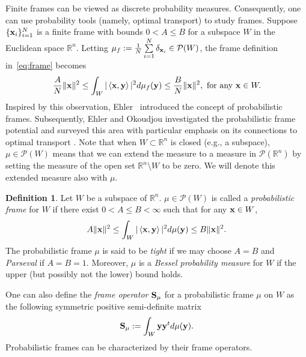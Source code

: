 \documentclass{amsart}
\numberwithin{equation}{section}
\newcommand\bR{{\mathbb R}}
\theoremstyle{plain}
\theoremstyle{remark}
\theoremstyle{definition}
\newtheorem{definition}[theorem]{Definition}
\begin{document}
Finite frames can be viewed as discrete probability measures. Consequently, one can use probability tools (namely, optimal transport) to study frames. Suppose $\{{\bf x}_i\}_{i=1}^N$ is a finite frame with bounds $0<A \leq B$ for a subspace $W$ in the Euclidean space $\mathbb{R}^n$. Letting $\mu_f := \frac{1}{N} \sum\limits_{i=1}^N   \delta_{{\bf x}_i} \in \mathcal{P}(W)$,  the frame definition in~\cref{eq:frame} becomes 
\begin{equation*}
    \frac{A}{N} \Vert {\bf x}  \Vert^2 \leq\int_{W} \vert \left\langle {\bf x},{\bf y} \right\rangle \vert ^2 d\mu_f({\bf y})  \leq \frac{B}{N} \Vert {\bf x}  \Vert^2, \ \text{for any} \ {\bf x} \in W.
\end{equation*}
Inspired by this observation, Ehler~\cite{ehler2012random} introduced the concept of probabilistic frames. Subsequently, Ehler and Okoudjou investigated the probabilistic frame potential \cite{ehler2012minimization} and surveyed this area with particular emphasis on its connections to optimal transport \cite{ehler2013probabilistic}. 
Note that when $W \subset \mathbb{R}^n$ is closed (e.g., a subspace), $\mu \in \mathcal{P}(W)$ means that we can extend the measure to a measure in $\mathcal{P}(\mathbb{R}^n)$ by setting the measure of the open set $\bR^n  \setminus W$ to be zero.  We will denote this extended measure also with $\mu$.


\begin{definition}
Let $W$ be a subspace of $\mathbb{R}^n$. $\mu \in  \mathcal{P}(W)$ is called a \emph{probabilistic frame} for $W$ if there exist $0<A \leq B < \infty$ such that for any ${\bf x} \in W$, 
\begin{equation*}
    A \Vert {\bf x}  \Vert^2 \leq\int_{W} \vert \left\langle {\bf x},{\bf y} \right\rangle \vert ^2 d\mu({\bf y})  \leq B \Vert {\bf x}  \Vert^2.
\end{equation*}
The probabilistic frame $\mu$ is said to be \emph{tight} if we may choose $A = B$ and \emph{Parseval} if $A = B=1$. Moreover, $\mu$ is a \emph{Bessel probability measure} for $W$ if the upper (but possibly not the lower) bound holds. 
\end{definition}


One can also define the \emph{frame operator} ${\bf S}_\mu$ for a probabilistic frame $\mu$ on $W$ as the following symmetric positive semi-definite matrix
    \begin{equation*}
          {\bf S}_\mu := \int_{W}  {\bf y} {\bf y}^t d \mu({\bf y}).
    \end{equation*}
Probabilistic frames can be characterized by their frame operators. 
\end{document}
